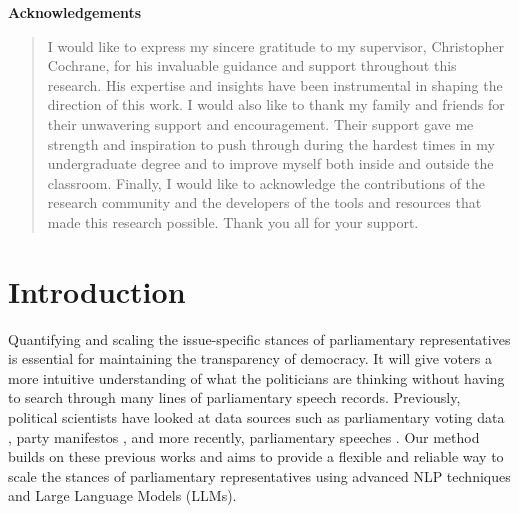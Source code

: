 \documentclass[final,5p,times,twocolumn,authoryear]{elsarticle}
\begin{document}
\begin{center}
	{\Large \textbf{Acknowledgements}}
  \end{center}
  \vspace{1em}
  \begin{quote}
  I would like to express my sincere gratitude to my supervisor, Christopher Cochrane, for his invaluable guidance and support throughout this research. His expertise and insights have been instrumental in shaping the direction of this work. I would also like to thank my family and friends for their unwavering support and encouragement. Their support gave me strength and inspiration to push through during the hardest times in my undergraduate degree and to improve myself both inside and outside the classroom. Finally, I would like to acknowledge the contributions of the research community and the developers of the tools and resources that made this research possible. Thank you all for your support.
  
  \end{quote}
  
  \clearpage






\newpage


\tableofcontents
\newpage
\listoffigures
\newpage
\listoftables

\twocolumn
{}

\section{Introduction}
Quantifying and scaling the issue-specific stances of parliamentary representatives is essential for maintaining the transparency of democracy. It will give voters a more intuitive understanding of what the politicians are thinking without having to search through many lines of parliamentary speech records. Previously, political scientists have looked at data sources such as parliamentary voting data \citep{dw-nominate}, party manifestos \citep{CATALINAC_2018}, and more recently, parliamentary speeches \citep{Word-embeddings-for-analysis-of-ideological-placement}. Our method builds on these previous works and aims to provide a flexible and reliable way to scale the stances of parliamentary representatives using advanced NLP techniques and Large Language Models (LLMs).
\end{document}
